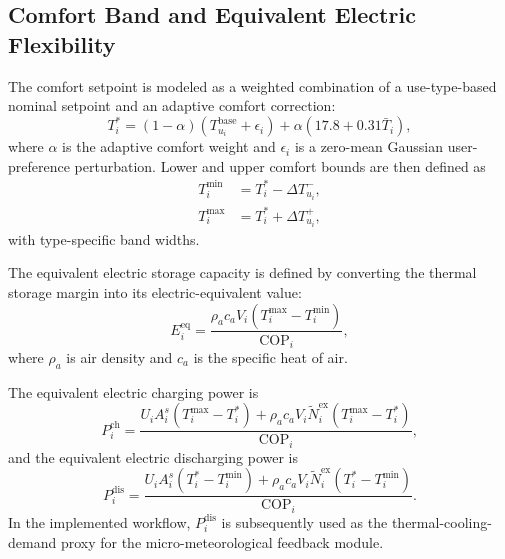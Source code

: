 \documentclass[conference]{IEEEtran}
\begin{document}
\subsection{Comfort Band and Equivalent Electric Flexibility}
The comfort setpoint is modeled as a weighted combination of a use-type-based nominal setpoint and an adaptive comfort correction:
\begin{equation}
    T^{\ast}_i = (1-\alpha)\left(T^{\mathrm{base}}_{u_i} + \epsilon_i\right) + \alpha \left(17.8 + 0.31\bar{T}_i\right),
\end{equation}
where $\alpha$ is the adaptive comfort weight and $\epsilon_i$ is a zero-mean Gaussian user-preference perturbation. Lower and upper comfort bounds are then defined as
\begin{align}
    T^{\min}_i &= T^{\ast}_i - \Delta T^{-}_{u_i}, \\
    T^{\max}_i &= T^{\ast}_i + \Delta T^{+}_{u_i},
\end{align}
with type-specific band widths.

The equivalent electric storage capacity is defined by converting the thermal storage margin into its electric-equivalent value:
\begin{equation}
    E^{\mathrm{eq}}_i =
    \frac{\rho_a c_a V_i \left(T^{\max}_i - T^{\min}_i\right)}
    {\mathrm{COP}_i},
\end{equation}
where $\rho_a$ is air density and $c_a$ is the specific heat of air.

The equivalent electric charging power is
\begin{equation}
    P^{\mathrm{ch}}_i =
    \frac{
    U_i A^{s}_i \left(T^{\max}_i - T^{\ast}_i\right)
    + \rho_a c_a V_i \tilde{N}^{\mathrm{ex}}_i \left(T^{\max}_i - T^{\ast}_i\right)
    }{\mathrm{COP}_i},
\end{equation}
and the equivalent electric discharging power is
\begin{equation}
    P^{\mathrm{dis}}_i =
    \frac{
    U_i A^{s}_i \left(T^{\ast}_i - T^{\min}_i\right)
    + \rho_a c_a V_i \tilde{N}^{\mathrm{ex}}_i \left(T^{\ast}_i - T^{\min}_i\right)
    }{\mathrm{COP}_i}.
\end{equation}
In the implemented workflow, $P^{\mathrm{dis}}_i$ is subsequently used as the thermal-cooling-demand proxy for the micro-meteorological feedback module.
\end{document}
